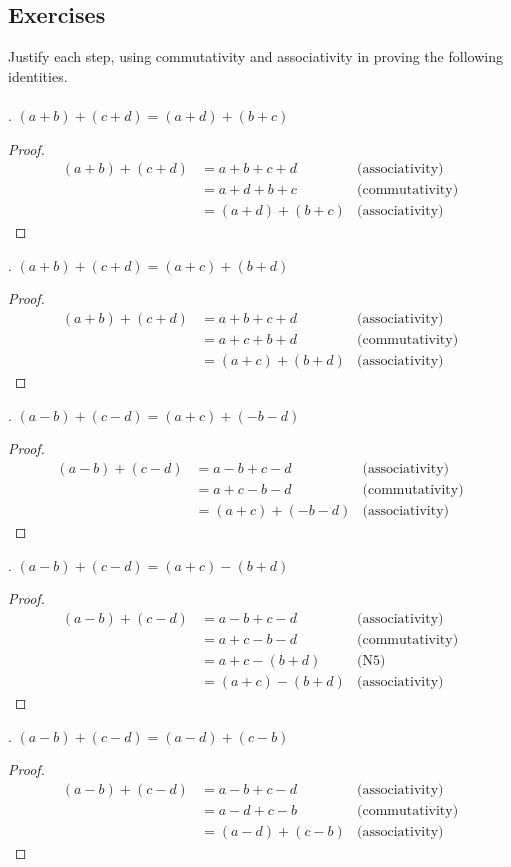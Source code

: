 \documentclass[12pt]{article}
\begin{document}
\subsection*{Exercises}
Justify each step, using commutativity and associativity in proving the following identities. \\
\\
. $(a+b)+(c+d)=(a+d)+(b+c)$
\begin{proof}
\begin{align*}
(a+b)+(c+d)&=a+b+c+d &\text{(associativity)} \\
&=a+d+b+c &\text{(commutativity)} \\
&=(a+d)+(b+c) &\text{(associativity)}
\end{align*}
\end{proof}
. $(a+b)+(c+d)=(a+c)+(b+d)$
\begin{proof}
\begin{align*}
(a+b)+(c+d)&=a+b+c+d &\text{(associativity)} \\
&=a+c+b+d &\text{(commutativity)} \\
&=(a+c)+(b+d) &\text{(associativity)}
\end{align*}
\end{proof}
. $(a-b)+(c-d)=(a+c)+(-b-d)$
\begin{proof}
\begin{align*}
(a-b)+(c-d)&=a-b+c-d &\text{(associativity)} \\
&=a+c-b-d &\text{(commutativity)} \\
&=(a+c)+(-b-d) &\text{(associativity)}
\end{align*}
\end{proof}
. $(a-b)+(c-d)=(a+c)-(b+d)$
\begin{proof}
\begin{align*}
(a-b)+(c-d)&=a-b+c-d &\text{(associativity)} \\
&=a+c-b-d &\text{(commutativity)} \\
&=a+c-(b+d) &\text{(N5)} \\
&=(a+c)-(b+d) &\text{(associativity)}
\end{align*}
\end{proof}
. $(a-b)+(c-d)=(a-d)+(c-b)$
\begin{proof}
\begin{align*}
(a-b)+(c-d)&=a-b+c-d &\text{(associativity)} \\
&=a-d+c-b &\text{(commutativity)} \\
&=(a-d)+(c-b) &\text{(associativity)}
\end{align*}
\end{proof}
\end{document}
